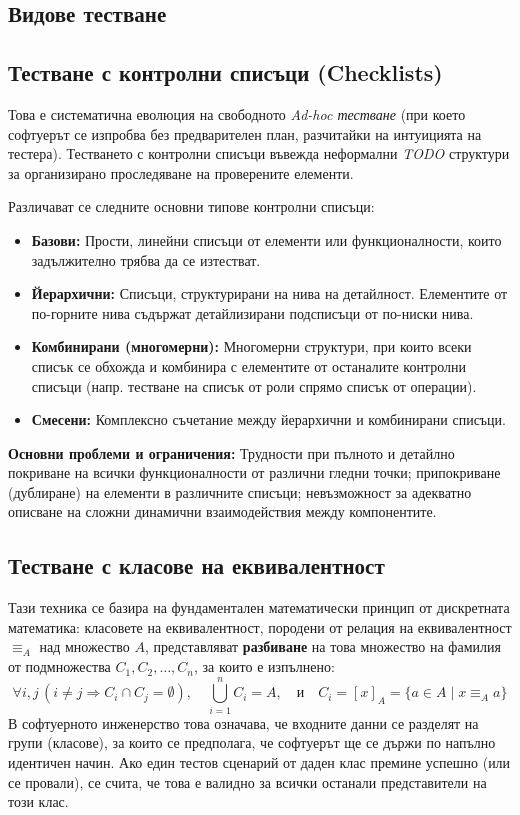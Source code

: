 \documentclass{scrartcl}
\begin{document}
\begin{FlushLeft}
\section{Видове тестване}

\subsection{Тестване с контролни списъци (Checklists)}
Това е систематична еволюция на свободното \textit{Ad-hoc тестване} (при което софтуерът се изпробва без предварителен план, разчитайки на интуицията на тестера). Тестването с контролни списъци въвежда неформални \textit{TODO} структури за организирано проследяване на проверените елементи.

Различават се следните основни типове контролни списъци:
\begin{itemize}
    \item \textbf{Базови:} Прости, линейни списъци от елементи или функционалности, които задължително трябва да се изтестват.
    \item \textbf{Йерархични:} Списъци, структурирани на нива на детайлност. Елементите от по-горните нива съдържат детайлизирани подсписъци от по-ниски нива.
    \item \textbf{Комбинирани (многомерни):} Многомерни структури, при които всеки списък се обхожда и комбинира с елементите от останалите контролни списъци (напр. тестване на списък от роли спрямо списък от операции).
    \item \textbf{Смесени:} Комплексно съчетание между йерархични и комбинирани списъци.
\end{itemize}
\textbf{Основни проблеми и ограничения:} Трудности при пълното и детайлно покриване на всички функционалности от различни гледни точки; припокриване (дублиране) на елементи в различните списъци; невъзможност за адекватно описване на сложни динамични взаимодействия между компонентите.

\subsection{Тестване с класове на еквивалентност}
Тази техника се базира на фундаментален математически принцип от дискретната математика: класовете на еквивалентност, породени от релация на еквивалентност $\equiv_A$ над множество $A$, представляват \textbf{разбиване} на това множество на фамилия от подмножества $C_1, C_2, \dots, C_n$, за които е изпълнено:
\begin{equation*}
\forall i, j \, (i \neq j \Rightarrow C_i \cap C_j = \emptyset), \quad \bigcup_{i=1}^{n} C_i = A, \quad \text{и} \quad C_i = [x]_A = \{a \in A \mid x \equiv_A a\}
\end{equation*}
В софтуерното инженерство това означава, че входните данни се разделят на групи (класове), за които се предполага, че софтуерът ще се държи по напълно идентичен начин. Ако един тестов сценарий от даден клас премине успешно (или се провали), се счита, че това е валидно за всички останали представители на този клас.


\end{FlushLeft}
\end{document}
